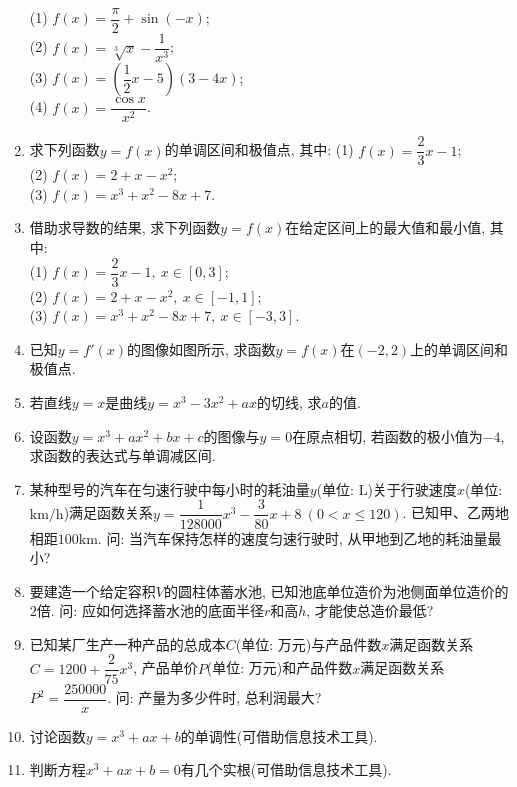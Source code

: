 \documentclass[10pt,a4paper]{article}
\begin{document}
\begin{enumerate}[1.]
(1) $f(x)=\dfrac\pi 2+\sin(-x)$;\\
(2) $f(x)=\sqrt[3]{x}-\dfrac{1}{x^3}$;\\
(3) $f(x)=(\dfrac 12 x-5)(3-4x)$;\\
(4) $f(x)=\dfrac{\cos x}{x^2}$.
\item 求下列函数$y=f(x)$的单调区间和极值点, 其中:
(1) $f(x)=\dfrac 23 x-1$;\\
(2) $f(x)=2+x-x^2$;\\
(3) $f(x)=x^3+x^2-8x+7$.
\item 借助求导数的结果, 求下列函数$y=f(x)$在给定区间上的最大值和最小值, 其中:\\
(1) $f(x)=\dfrac 23 x-1, \  x\in [0, 3]$;\\
(2) $f(x)=2+x-x^2, \ x\in [-1, 1]$;\\
(3) $f(x)=x^3+x^2-8x+7, \ x\in [-3, 3]$.
\item 已知$y=f'(x)$的图像如图所示, 求函数$y=f(x)$在$(-2,2)$上的单调区间和极值点.
\begin{center}
\end{center}
\item 若直线$y=x$是曲线$y=x^3-3x^2+ax$的切线, 求$a$的值.
\item 设函数$y=x^3+ax^2+bx+c$的图像与$y=0$在原点相切, 若函数的极小值为$-4$, 求函数的表达式与单调减区间.
\item 某种型号的汽车在匀速行驶中每小时的耗油量$y$(单位: $\text{L}$)关于行驶速度$x$(单位: $\text{km}/\text{h}$)满足函数关系$y=\dfrac 1{128000}x^3-\dfrac 3{80}x+8 \ (0<x\le 120)$. 已知甲、乙两地相距$100\text{km}$. 问: 当汽车保持怎样的速度匀速行驶时, 从甲地到乙地的耗油量最小?
\item 要建造一个给定容积$V$的圆柱体蓄水池, 已知池底单位造价为池侧面单位造价的$2$倍. 问: 应如何选择蓄水池的底面半径$r$和高$h$, 才能使总造价最低?
\item 已知某厂生产一种产品的总成本$C$(单位: 万元)与产品件数$x$满足函数关系$C=1200+\dfrac2 {75}x^3$, 产品单价$P$(单位: 万元)和产品件数$x$满足函数关系$P^2=\dfrac{250000}x$. 问: 产量为多少件时, 总利润最大?
\item 讨论函数$y=x^3+ax+b$的单调性(可借助信息技术工具).
\item 判断方程$x^3+ax+b=0$有几个实根(可借助信息技术工具).


\end{enumerate}
\end{document}
